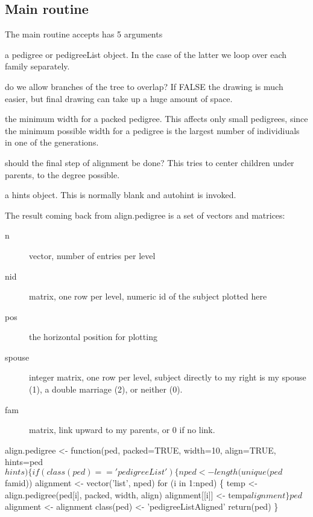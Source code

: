 \documentclass{article}
\begin{document}
\subsection{Main routine}
\label{sect:alignped}
The main routine accepts has 5 arguments
\begin{description}
    \item[ped] a pedigree or pedigreeList object. In the case of
      the latter we loop over each family separately.
    \item[packed] do we allow branches of the tree to overlap?  
      If FALSE the drawing is much easier, but final drawing can
      take up a huge amount of space.  
    \item[width] the minimum width for a packed pedigree. This
      affects only small pedigrees, since the minimum possible
      width for a pedigree is the largest number of individiuals in
      one of the generations.
    \item[align] should the final step of alignment be done?  This
      tries to center children under parents, to the degree possible.
    \item a hints object.  This is normally blank and autohint
      is invoked. 
\end{description}
The result coming back from align.pedigree is a set of vectors and
matrices:
\begin{description}
  \item[n] vector, number of entries per level
  \item[nid] matrix, one row per level, numeric id of the subject plotted
    here
  \item[pos] the horizontal position for plotting
  \item[spouse] integer matrix, one row per level, subject directly to my
    right is my spouse (1), a double marriage (2), or neither (0).
  \item[fam] matrix, link upward to my parents, or 0 if no link.
\end{description}
\nwenddocs{}\endmoddef
align.pedigree <- function(ped, packed=TRUE, width=10,
                           align=TRUE, hints=ped$hints) \{
    if (class(ped)== 'pedigreeList') \{
        nped <- length(unique(ped$famid))
        alignment <- vector('list', nped)
        for (i in 1:nped) \{
            temp <- align.pedigree(ped[i], packed, width, align)
            alignment[[i]] <- temp$alignment
            \}
        ped$alignment <- alignment
        class(ped) <- 'pedigreeListAligned'
        return(ped)
        \}
    
\end{document}
